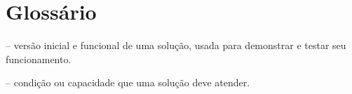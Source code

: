 \chapter*{Glossário}

\begin{description}[leftmargin=0pt, labelsep=0.5em, itemsep=0.5\baselineskip]
  \item[Protótipo] -- versão inicial e funcional de uma solução, usada para
        demonstrar e testar seu funcionamento.
  \item[Requisito] -- condição ou capacidade que uma solução deve atender.
\end{description}

